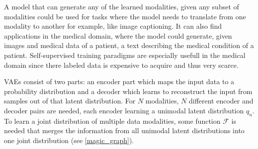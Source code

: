 A model that can generate any of the learned modalities, given any subset of modalities could be used for tasks where the model needs to translate from one modality to another for example, like image captioning.
It can also find applications in the medical domain, where the model could generate, given images and medical data of a patient, a text describing the medical condition of a patient.
Self-supervised training paradigms are especially usefull in the medical domain since there labeled data is expensive to acquire and thus very scarce.


VAEs consist of two parts: an encoder part which maps the input data to a probability distribution and a decoder which learns to reconstruct the input from samples out of that latent distribution.
For $N$ modalities, $N$ different encoder and decoder pairs are needed, each encoder learning a unimodal latent distribution $q_n$.
To learn a joint distribution of multiple data modalities, some function $\mathcal{F}$ is needed that merges the information from all unimodal latent distributions into one joint distribution (see \cref{magic_graph}).


